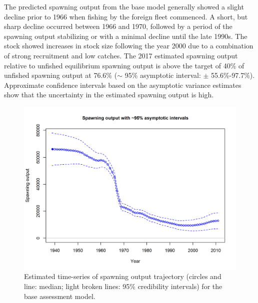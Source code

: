 \documentclass[12pt,]{article}
\begin{document}
The predicted spawning output from the base model generally showed a
slight decline prior to 1966 when fishing by the foreign fleet
commenced. A short, but sharp decline occurred between 1966 and 1970,
followed by a period of the spawning output stabilizing or with a
minimal decline until the late 1990s. The stock showed increases in
stock size following the year 2000 due to a combination of strong
recruitment and low catches. The 2017 estimated spawning output relative
to unfished equilibrium spawning output is above the target of 40\% of
unfished spawning output at 76.6\% (\(\sim\) 95\% asymptotic interval:
\(\pm\) 55.6\%-97.7\%). Approximate confidence intervals based on the
asymptotic variance estimates show that the uncertainty in the estimated
spawning output is high.

\begin{figure}
\centering
\includegraphics{r4ss/plots_mod1/ts7_Spawning_output_with_95_asymptotic_intervals_intervals.png}
\caption{Estimated time-series of spawning output trajectory (circles
and line: median; light broken lines: 95\% credibility intervals) for
the base assessment model. \label{fig:Spawnbio_all}}
\end{figure}
\end{document}
